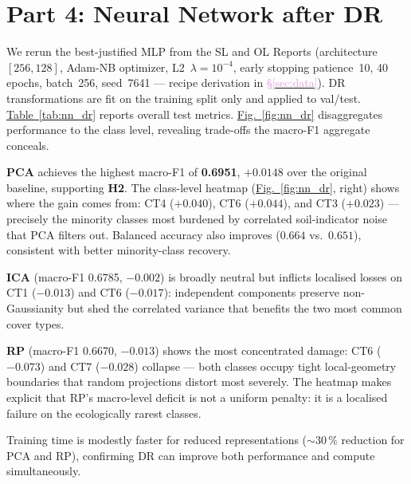\documentclass[conference]{IEEEtran}
\newcommand{\figref}[1]{\hyperref[#1]{\textcolor{denim_comp}{Fig.~\ref*{#1}}}}
\newcommand{\tabref}[1]{\hyperref[#1]{\textcolor{sage}{Table~\ref*{#1}}}}
\newcommand{\secref}[1]{\hyperref[#1]{\textcolor{plum}{\S\ref*{#1}}}}
\begin{document}
\section{Part 4: Neural Network after DR}\label{sec:p4}

We rerun the best-justified MLP from the SL and OL Reports
(architecture~$[256,128]$, Adam-NB optimizer, L2~$\lambda{=}10^{-4}$,
early stopping patience~10, 40 epochs, batch~256, seed~7641 ---
recipe derivation in \secref{sec:data}).
DR transformations are fit on the training split only and applied to
val/test.
\tabref{tab:nn_dr} reports overall test metrics.
\figref{fig:nn_dr} disaggregates performance to the class level, revealing
trade-offs the macro-F1 aggregate conceals.

\textbf{PCA} achieves the highest macro-F1 of \textbf{0.6951}, $+0.0148$
over the original baseline, supporting \textbf{H2}.
The class-level heatmap (\figref{fig:nn_dr}, right) shows where the gain
comes from: CT4 ($+0.040$), CT6 ($+0.044$), and CT3 ($+0.023$) ---
precisely the minority classes most burdened by correlated soil-indicator
noise that PCA filters out.
Balanced accuracy also improves ($0.664$ vs.\ $0.651$), consistent with
better minority-class recovery.

\textbf{ICA} (macro-F1 0.6785, $-0.002$) is broadly neutral but inflicts
localised losses on CT1 ($-0.013$) and CT6 ($-0.017$): independent
components preserve non-Gaussianity but shed the correlated variance that
benefits the two most common cover types.

\textbf{RP} (macro-F1 0.6670, $-0.013$) shows the most concentrated damage:
CT6 ($-0.073$) and CT7 ($-0.028$) collapse --- both classes occupy tight
local-geometry boundaries that random projections distort most severely.
The heatmap makes explicit that RP's macro-level deficit is not a uniform
penalty: it is a localised failure on the ecologically rarest classes.

Training time is modestly faster for reduced representations
($\sim 30\,\%$ reduction for PCA and RP), confirming DR can improve
both performance and compute simultaneously.
\end{document}

